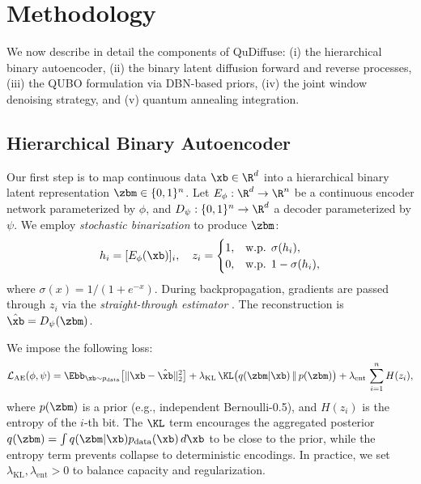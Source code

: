 \documentclass[11pt,letterpaper]{article}
\begin{document}
\section{Methodology}
\label{sec:methodology}

We now describe in detail the components of QuDiffuse: (i) the hierarchical binary autoencoder, (ii) the binary latent diffusion forward and reverse processes, (iii) the QUBO formulation via DBN-based priors, (iv) the joint window denoising strategy, and (v) quantum annealing integration.

\subsection{Hierarchical Binary Autoencoder}
\label{subsec:autoencoder}

Our first step is to map continuous data $\xb \in \R^d$ into a hierarchical binary latent representation $\zbm \in \{0,1\}^n$. Let $E_\phi: \R^d \to \R^n$ be a continuous encoder network parameterized by $\phi$, and $D_\psi: \{0,1\}^n \to \R^d$ a decoder parameterized by $\psi$. We employ \emph{stochastic binarization} to produce $\zbm$:
\begin{equation}
h_i = [E_\phi(\xb)]_i, \quad
z_i = 
\begin{cases}
1, & \text{w.p. }\sigma(h_i),\\
0, & \text{w.p. }1-\sigma(h_i),
\end{cases}
\end{equation}
where $\sigma(x)=1/(1+e^{-x})$. During backpropagation, gradients are passed through $z_i$ via the \emph{straight-through estimator} \cite{bengio2013estimating}. The reconstruction is $\hat{\xb} = D_\psi(\zbm)$.

We impose the following loss:
\begin{equation}
\mathcal{L}_{\text{AE}}(\phi,\psi) 
= \Ebb_{\xb \sim p_{\text{data}}}\bigl[\|\xb - \hat{\xb}\|_2^2\bigr]
+ \lambda_{\text{KL}}\, \KL\bigl(q(\zbm|\xb)\,\|\,p(\zbm)\bigr)
+ \lambda_{\text{ent}}\, \sum_{i=1}^n H(z_i),
\label{eq:ae-loss}
\end{equation}
where $p(\zbm)$ is a prior (e.g., independent Bernoulli-0.5), and $H(z_i)$ is the entropy of the $i$-th bit. The $\KL$ term encourages the aggregated posterior $q(\zbm) = \int q(\zbm|\xb) p_{\text{data}}(\xb)\,d\xb$ to be close to the prior, while the entropy term prevents collapse to deterministic encodings. In practice, we set $\lambda_{\text{KL}}, \lambda_{\text{ent}} > 0$ to balance capacity and regularization.
\end{document}
